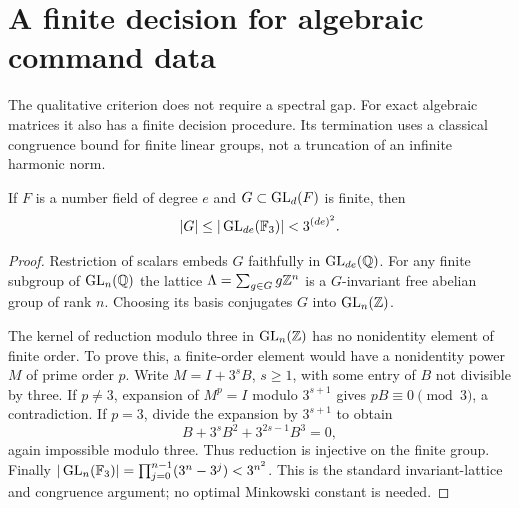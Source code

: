 \section{A finite decision for algebraic command data}\label{sec:decision45}
The qualitative criterion does not require a spectral gap. For exact algebraic matrices it also has a finite decision procedure. Its termination uses a classical congruence bound for finite linear groups, not a truncation of an infinite harmonic norm.

\begin{lemma}\label{lem:finite-bound45}
If $F$ is a number field of degree $e$ and $G\subset\operatorname{GL}_d(F)$ is finite, then
\begin{equation}\label{eq:minkowski-bound45}
 |G|\le|\operatorname{GL}_{de}(\mathbb F_3)|<3^{(de)^2}.
\end{equation}
\end{lemma}
\begin{proof}
Restriction of scalars embeds $G$ faithfully in $\operatorname{GL}_{de}(\mathbb Q)$. For any finite subgroup of $\operatorname{GL}_n(\mathbb Q)$ the lattice
$\Lambda=\sum_{g\in G}g\mathbb Z^n$ is a $G$-invariant free abelian group of rank $n$. Choosing its basis conjugates $G$ into $\operatorname{GL}_n(\mathbb Z)$.

The kernel of reduction modulo three in $\operatorname{GL}_n(\mathbb Z)$ has no nonidentity element of finite order. To prove this, a finite-order element would have a nonidentity power $M$ of prime order $p$. Write $M=I+3^sB$, $s\ge1$, with some entry of $B$ not divisible by three. If $p\ne3$, expansion of $M^p=I$ modulo $3^{s+1}$ gives $pB\equiv0\pmod3$, a contradiction. If $p=3$, divide the expansion by $3^{s+1}$ to obtain
\[
 B+3^sB^2+3^{2s-1}B^3=0,
\]
again impossible modulo three. Thus reduction is injective on the finite group. Finally
$|\operatorname{GL}_n(\mathbb F_3)|=\prod_{j=0}^{n-1}(3^n-3^j)<3^{n^2}$.
This is the standard invariant-lattice and congruence argument; no optimal Minkowski constant is needed.
\end{proof}

